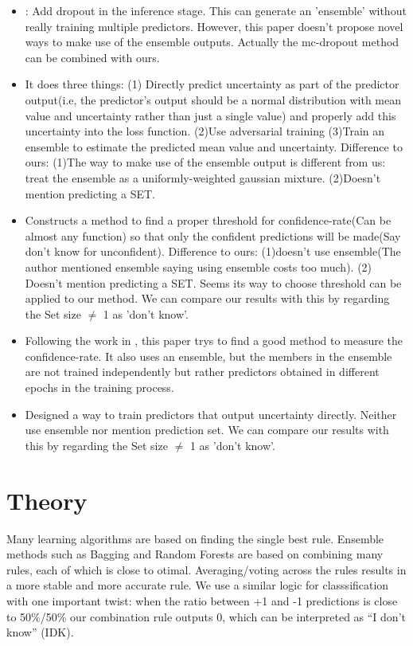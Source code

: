 \documentclass{article}
\begin{document}
\begin{itemize}
  \item \cite{mc-dropout}: Add dropout in the inference stage. This can generate an 'ensemble' without really training multiple predictors. However, this paper doesn't propose novel ways to make use of the ensemble outputs. Actually the mc-dropout method can be combined with ours.
  \item \cite{deep-ensemble} It does three things: (1) Directly predict uncertainty as part of the predictor output(i.e, the predictor's output should be a normal distribution with mean value and uncertainty rather than just a single value) and properly add this uncertainty into the loss function. (2)Use adversarial training (3)Train an ensemble to estimate the predicted mean value and uncertainty. Difference to ours: (1)The way to make use of the ensemble output is different from us: treat the ensemble as a uniformly-weighted gaussian mixture. (2)Doesn't mention predicting a SET.
  \item \cite{selective-classification} Constructs a method to find a proper threshold for confidence-rate(Can be almost any function) so that only the confident predictions will be made(Say don't know for unconfident). Difference to ours: (1)doesn't use ensemble(The author mentioned ensemble saying using ensemble costs too much). (2) Doesn't mention predicting a SET.  Seems its way to choose threshold can be applied to our method. We can compare our results with this by regarding the Set size $\neq$ 1 as 'don't know'.
  \item \cite{bias-reduced-uncertainty} Following the work in \cite{selective-classification}, this paper trys to find a good method to measure the confidence-rate. It also uses an ensemble, but the members in the ensemble are not trained independently but rather predictors obtained in different epochs in the training process.
  \item \cite{selectivenet} Designed a way to train predictors that output uncertainty directly. Neither use ensemble nor mention prediction set. We can compare our results with this by regarding the Set size $\neq$ 1 as 'don't know'.
\end{itemize}

\section{Theory}

Many learning algorithms are based on finding the single best
rule. Ensemble methods such as Bagging and Random Forests are based on
combining many rules, each of which is close to
otimal. Averaging/voting across the rules results in a more stable and
more accurate rule.  We use a similar logic for classsification with
one important twist: when the ratio between +1 and -1 predictions is
close to 50\%/50\% our combination rule outputs 0, which can be
interpreted as ``I don't know'' (IDK).
\end{document}
